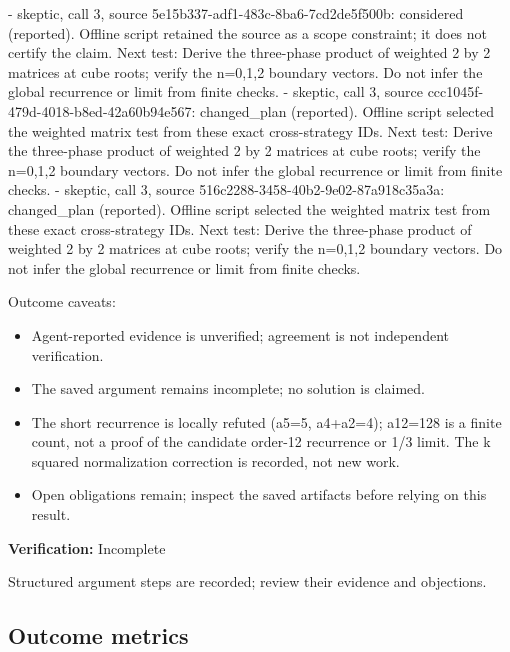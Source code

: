 \documentclass[11pt]{article}
\begin{document}
- skeptic, call 3, source 5e15b337-adf1-483c-8ba6-7cd2de5f500b: considered (reported). Offline script retained the source as a scope constraint; it does not certify the claim. Next test: Derive the three-phase product of weighted 2 by 2 matrices at cube roots; verify the n=0,1,2 boundary vectors. Do not infer the global recurrence or limit from finite checks.
- skeptic, call 3, source ccc1045f-479d-4018-b8ed-42a60b94e567: changed\_plan (reported). Offline script selected the weighted matrix test from these exact cross-strategy IDs. Next test: Derive the three-phase product of weighted 2 by 2 matrices at cube roots; verify the n=0,1,2 boundary vectors. Do not infer the global recurrence or limit from finite checks.
- skeptic, call 3, source 516c2288-3458-40b2-9e02-87a918c35a3a: changed\_plan (reported). Offline script selected the weighted matrix test from these exact cross-strategy IDs. Next test: Derive the three-phase product of weighted 2 by 2 matrices at cube roots; verify the n=0,1,2 boundary vectors. Do not infer the global recurrence or limit from finite checks.\par
Outcome caveats:\par
\begin{itemize}
\item Agent-reported evidence is unverified; agreement is not independent verification.
\item The saved argument remains incomplete; no solution is claimed.
\item The short recurrence is locally refuted (a5=5, a4+a2=4); a12=128 is a finite count, not a proof of the candidate order-12 recurrence or 1/3 limit. The k squared normalization correction is recorded, not new work.
\item Open obligations remain; inspect the saved artifacts before relying on this result.
\end{itemize}
\textbf{Verification:} Incomplete\par
Structured argument steps are recorded; review their evidence and objections.\par
\subsection{Outcome metrics}
\end{document}
